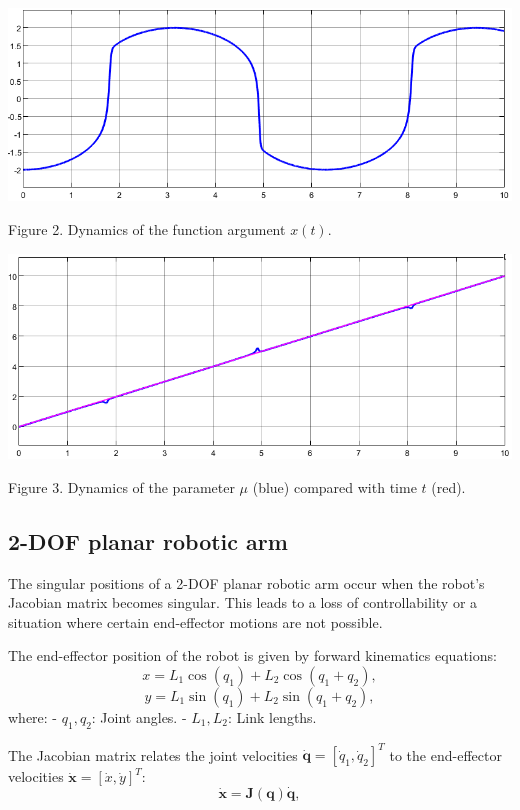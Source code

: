 \documentclass[11pt,american]{article}
\begin{document}
\begin{center}
\ifpdf %
  \includegraphics[width=1\textwidth]{toy_x.png}
\fi

Figure 2. Dynamics of the function argument $x(t)$.
\end{center}

\begin{center}
\ifpdf %
  \includegraphics[width=1\textwidth]{toy_mu.png}
\fi

Figure 3. Dynamics of the parameter $\mu$ (blue) compared with time $t$ (red).
\end{center}

\subsection{2-DOF planar robotic arm}

The singular positions of a 2-DOF planar robotic arm occur when the robot's Jacobian matrix becomes singular. This leads to a loss of controllability or a situation where certain end-effector motions are not possible.

The end-effector position of the robot is given by forward kinematics equations:
\[
x = L_1 \cos(q_1) + L_2 \cos(q_1 + q_2),
\]
\[
y = L_1 \sin(q_1) + L_2 \sin(q_1 + q_2),
\]
where:
- \( q_1, q_2 \): Joint angles.
- \( L_1, L_2 \): Link lengths.

The Jacobian matrix relates the joint velocities \( \dot{\mathbf{q}} = [\dot{q}_1, \dot{q}_2]^T \) to the end-effector velocities \( \dot{\mathbf{x}} = [\dot{x}, \dot{y}]^T \):
\[
\dot{\mathbf{x}} = \mathbf{J}(\mathbf{q}) \dot{\mathbf{q}},
\]
\end{document}
